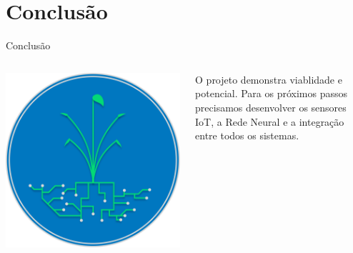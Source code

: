 \documentclass[10pt]{beamer}
\begin{document}
\section{Conclusão}
\begin{frame}{Conclusão}

\begin{columns}[T,onlytextwidth]
    \centering
    \includegraphics[width=\textwidth]{imagens/LOGO PI.png}
    
    \raggedright
    \begin{minipage}{\linewidth}
    \hspace{0.5cm}\parbox{0.9\linewidth}{\small\textcolor{cpspreto}{O projeto demonstra viablidade e potencial. Para os próximos passos precisamos desenvolver os sensores IoT, a Rede Neural e a integração entre todos os sistemas.}}
    \end{minipage}
\end{columns}

\end{frame}
\end{document}

